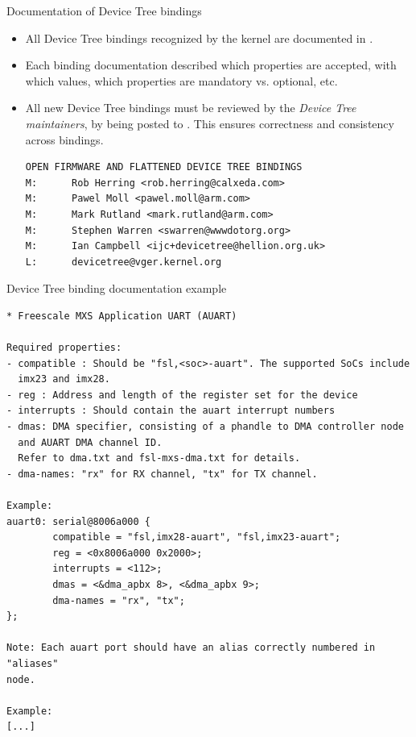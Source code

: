 \documentclass[obeyspaces,spaces,hyphens]{beamer}
\begin{document}
\begin{frame}[fragile]{Documentation of Device Tree bindings}
  \begin{itemize}
  \item All Device Tree bindings recognized by the kernel are
    documented in .
  \item Each binding documentation described which properties are
    accepted, with which values, which properties are mandatory
    vs. optional, etc.
  \item All new Device Tree bindings must be reviewed by the {\em
      Device Tree maintainers}, by being posted to
    . This ensures correctness and
    consistency across bindings.
    \begin{block}{}
      \tiny
\begin{verbatim}
OPEN FIRMWARE AND FLATTENED DEVICE TREE BINDINGS
M:      Rob Herring <rob.herring@calxeda.com>
M:      Pawel Moll <pawel.moll@arm.com>
M:      Mark Rutland <mark.rutland@arm.com>
M:      Stephen Warren <swarren@wwwdotorg.org>
M:      Ian Campbell <ijc+devicetree@hellion.org.uk>
L:      devicetree@vger.kernel.org
\end{verbatim}
    \end{block}
  \end{itemize}
\end{frame}

\begin{frame}[fragile]{Device Tree binding documentation example}
  \tiny
  \begin{block}{}
  \begin{verbatim}
* Freescale MXS Application UART (AUART)

Required properties:
- compatible : Should be "fsl,<soc>-auart". The supported SoCs include
  imx23 and imx28.
- reg : Address and length of the register set for the device
- interrupts : Should contain the auart interrupt numbers
- dmas: DMA specifier, consisting of a phandle to DMA controller node
  and AUART DMA channel ID.
  Refer to dma.txt and fsl-mxs-dma.txt for details.
- dma-names: "rx" for RX channel, "tx" for TX channel.

Example:
auart0: serial@8006a000 {
        compatible = "fsl,imx28-auart", "fsl,imx23-auart";
        reg = <0x8006a000 0x2000>;
        interrupts = <112>;
        dmas = <&dma_apbx 8>, <&dma_apbx 9>;
        dma-names = "rx", "tx";
};

Note: Each auart port should have an alias correctly numbered in "aliases"
node.

Example:
[...]
\end{verbatim}
  \end{block}
\end{frame}
\end{document}
